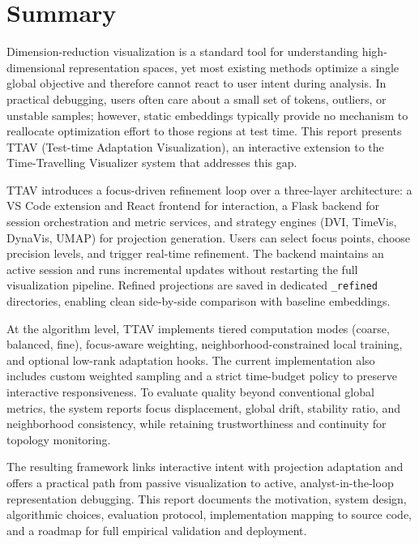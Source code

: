 \documentclass[12pt,a4paper]{report}
\newcommand{\systemname}{TTAV}
\newcommand{\projectname}{Time-Travelling Visualizer}
\begin{document}
\tableofcontents

\chapter*{Summary}
Dimension-reduction visualization is a standard tool for understanding high-dimensional representation spaces, yet most existing methods optimize a single global objective and therefore cannot react to user intent during analysis. In practical debugging, users often care about a small set of tokens, outliers, or unstable samples; however, static embeddings typically provide no mechanism to reallocate optimization effort to those regions at test time. This report presents \systemname{} (Test-time Adaptation Visualization), an interactive extension to the \projectname{} system that addresses this gap.

\systemname{} introduces a focus-driven refinement loop over a three-layer architecture: a VS Code extension and React frontend for interaction, a Flask backend for session orchestration and metric services, and strategy engines (DVI, TimeVis, DynaVis, UMAP) for projection generation. Users can select focus points, choose precision levels, and trigger real-time refinement. The backend maintains an active session and runs incremental updates without restarting the full visualization pipeline. Refined projections are saved in dedicated \texttt{\_refined} directories, enabling clean side-by-side comparison with baseline embeddings.

At the algorithm level, \systemname{} implements tiered computation modes (coarse, balanced, fine), focus-aware weighting, neighborhood-constrained local training, and optional low-rank adaptation hooks. The current implementation also includes custom weighted sampling and a strict time-budget policy to preserve interactive responsiveness. To evaluate quality beyond conventional global metrics, the system reports focus displacement, global drift, stability ratio, and neighborhood consistency, while retaining trustworthiness and continuity for topology monitoring.

The resulting framework links interactive intent with projection adaptation and offers a practical path from passive visualization to active, analyst-in-the-loop representation debugging. This report documents the motivation, system design, algorithmic choices, evaluation protocol, implementation mapping to source code, and a roadmap for full empirical validation and deployment.
\end{document}

